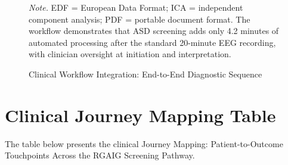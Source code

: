 \begin{figure}[!htbp]
{%
    }
    \caption[Clinical Workflow Integration]{Clinical Workflow Integration: End-to-End Diagnostic Sequence}
    \label{fig:clinical_workflow_appx}
    \vspace{0.5em}\noindent\textit{Note.} EDF = European Data Format; ICA = independent component analysis; PDF = portable document format. The workflow demonstrates that ASD screening adds only 4.2 minutes of automated processing after the standard 20-minute EEG recording, with clinician oversight at initiation and interpretation.
\end{figure}


\section*{Clinical Journey Mapping Table}
\label{sec:app_ch5_tab_clinical_journey_mapping}
\noindent The table below presents the clinical Journey Mapping: Patient-to-Outcome Touchpoints Across the RGAIG Screening Pathway.


